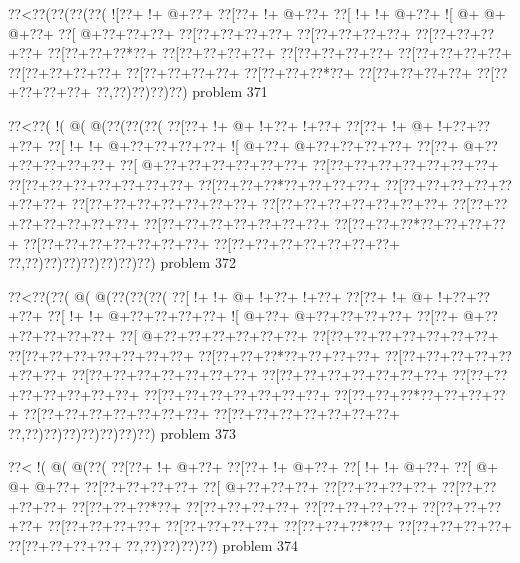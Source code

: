 \vbox{\vbox{\goo
\0??<\0??(\0??(\0??(\0??(
\- ![\0??+\- !+\- @+\0??+
\0??[\0??+\- !+\- @+\0??+
\0??[\- !+\- !+\- @+\0??+
\- ![\- @+\- @+\- @+\0??+
\0??[\- @+\0??+\0??+\0??+
\0??[\0??+\0??+\0??+\0??+
\0??[\0??+\0??+\0??+\0??+
\0??[\0??+\0??+\0??+\0??+
\0??[\0??+\0??+\0??*\0??+
\0??[\0??+\0??+\0??+\0??+
\0??[\0??+\0??+\0??+\0??+
\0??[\0??+\0??+\0??+\0??+
\0??[\0??+\0??+\0??+\0??+
\0??[\0??+\0??+\0??+\0??+
\0??[\0??+\0??+\0??*\0??+
\0??[\0??+\0??+\0??+\0??+
\0??[\0??+\0??+\0??+\0??+
\0??,\0??)\0??)\0??)\0??)
}
\hfil problem 371\hfil\break
}

\vbox{\vbox{\goo
\0??<\0??(\- !(\- @(\- @(\0??(\0??(\0??(
\0??[\0??+\- !+\- @+\- !+\0??+\- !+\0??+
\0??[\0??+\- !+\- @+\- !+\0??+\0??+\0??+
\0??[\- !+\- !+\- @+\0??+\0??+\0??+\0??+
\- ![\- @+\0??+\- @+\0??+\0??+\0??+\0??+
\0??[\0??+\- @+\0??+\0??+\0??+\0??+\0??+
\0??[\- @+\0??+\0??+\0??+\0??+\0??+\0??+
\0??[\0??+\0??+\0??+\0??+\0??+\0??+\0??+
\0??[\0??+\0??+\0??+\0??+\0??+\0??+\0??+
\0??[\0??+\0??+\0??*\0??+\0??+\0??+\0??+
\0??[\0??+\0??+\0??+\0??+\0??+\0??+\0??+
\0??[\0??+\0??+\0??+\0??+\0??+\0??+\0??+
\0??[\0??+\0??+\0??+\0??+\0??+\0??+\0??+
\0??[\0??+\0??+\0??+\0??+\0??+\0??+\0??+
\0??[\0??+\0??+\0??+\0??+\0??+\0??+\0??+
\0??[\0??+\0??+\0??*\0??+\0??+\0??+\0??+
\0??[\0??+\0??+\0??+\0??+\0??+\0??+\0??+
\0??[\0??+\0??+\0??+\0??+\0??+\0??+\0??+
\0??,\0??)\0??)\0??)\0??)\0??)\0??)\0??)
}
\hfil problem 372\hfil\break
}

\vbox{\vbox{\goo
\0??<\0??(\0??(\- @(\- @(\0??(\0??(\0??(
\0??[\- !+\- !+\- @+\- !+\0??+\- !+\0??+
\0??[\0??+\- !+\- @+\- !+\0??+\0??+\0??+
\0??[\- !+\- !+\- @+\0??+\0??+\0??+\0??+
\- ![\- @+\0??+\- @+\0??+\0??+\0??+\0??+
\0??[\0??+\- @+\0??+\0??+\0??+\0??+\0??+
\0??[\- @+\0??+\0??+\0??+\0??+\0??+\0??+
\0??[\0??+\0??+\0??+\0??+\0??+\0??+\0??+
\0??[\0??+\0??+\0??+\0??+\0??+\0??+\0??+
\0??[\0??+\0??+\0??*\0??+\0??+\0??+\0??+
\0??[\0??+\0??+\0??+\0??+\0??+\0??+\0??+
\0??[\0??+\0??+\0??+\0??+\0??+\0??+\0??+
\0??[\0??+\0??+\0??+\0??+\0??+\0??+\0??+
\0??[\0??+\0??+\0??+\0??+\0??+\0??+\0??+
\0??[\0??+\0??+\0??+\0??+\0??+\0??+\0??+
\0??[\0??+\0??+\0??*\0??+\0??+\0??+\0??+
\0??[\0??+\0??+\0??+\0??+\0??+\0??+\0??+
\0??[\0??+\0??+\0??+\0??+\0??+\0??+\0??+
\0??,\0??)\0??)\0??)\0??)\0??)\0??)\0??)
}
\hfil problem 373\hfil\break
}

\vbox{\vbox{\goo
\0??<\- !(\- @(\- @(\0??(
\0??[\0??+\- !+\- @+\0??+
\0??[\0??+\- !+\- @+\0??+
\0??[\- !+\- !+\- @+\0??+
\0??[\- @+\- @+\- @+\0??+
\0??[\0??+\0??+\0??+\0??+
\0??[\- @+\0??+\0??+\0??+
\0??[\0??+\0??+\0??+\0??+
\0??[\0??+\0??+\0??+\0??+
\0??[\0??+\0??+\0??*\0??+
\0??[\0??+\0??+\0??+\0??+
\0??[\0??+\0??+\0??+\0??+
\0??[\0??+\0??+\0??+\0??+
\0??[\0??+\0??+\0??+\0??+
\0??[\0??+\0??+\0??+\0??+
\0??[\0??+\0??+\0??*\0??+
\0??[\0??+\0??+\0??+\0??+
\0??[\0??+\0??+\0??+\0??+
\0??,\0??)\0??)\0??)\0??)
}
\hfil problem 374\hfil\break
}

